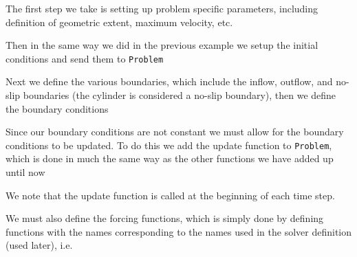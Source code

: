    The first step we take is setting up problem specific parameters, including
    definition of geometric extent, maximum velocity, etc.
    
    
    Then in the same way we did in the previous example we setup the initial
    conditions and send them to \texttt{Problem}
    
    

    Next we define the various boundaries, which include the inflow, outflow,
    and no-slip boundaries (the cylinder is considered a no-slip boundary), then
    we define the boundary conditions
    
    

    Since our boundary conditions are not constant we must allow for the
    boundary conditions to be updated. To do this we add the update function to
    \texttt{Problem}, which is done in much the same way as the other functions
    we have added up until now
    

    \begin{remark}
        We note that the update function is called at the beginning
        of each time step.
    \end{remark}

    We must also define the forcing functions, which is simply done by defining
    functions with the names corresponding to the names used in the solver
    definition (used later), i.e.
    

